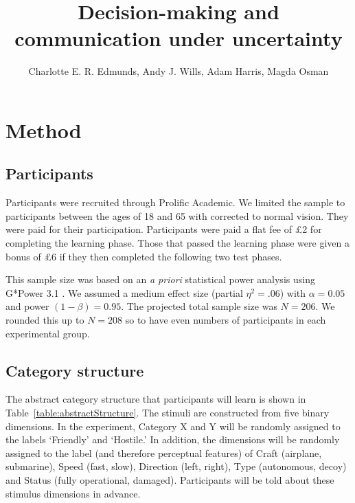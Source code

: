 \documentclass[doc, a4paper, apacite]{apa6}
\title{Decision-making and communication under uncertainty}
\author{Charlotte E. R. Edmunds, Andy J. Wills, Adam Harris, Magda Osman}
\affiliation{Queen Mary, UCL, University of London \\ 11 January 2021}
\begin{document}
\maketitle
	\doublespacing

\section{Method}

\subsection{Participants}
Participants were recruited through Prolific Academic.
We limited the sample to participants between the ages of 18 and 65 with corrected to normal vision. 
They were paid for their participation.
Participants were paid a flat fee of \pounds 2 for completing the learning phase.
Those that passed the learning phase were given a bonus of \pounds 6 if they then completed the following two test phases. 

This sample size was based on an \emph{a priori} statistical power analysis using G*Power 3.1 \cite{GPower2007, GPower2009}. 
We assumed a medium effect size (partial $\eta^2 = .06$) with $\alpha=0.05$ and power $(1-\beta)= 0.95$.
The projected total sample size was $N=206$.
We rounded this up to $N=208$ so to have even numbers of participants in each experimental group. 

\subsection{Category structure}
The abstract category structure that participants will learn is shown in Table~\ref{table:abstractStructure}. 
The stimuli are constructed from five binary dimensions. 
In the experiment, Category X and Y will be randomly assigned to the labels `Friendly' and `Hostile.' 
In addition, the dimensions will be randomly assigned to the label (and therefore perceptual features) of Craft (airplane, submarine), Speed (fast, slow), Direction (left, right), Type (autonomous, decoy) and Status (fully operational, damaged). 
Participants will be told about these stimulus dimensions in advance. 
\end{document}
